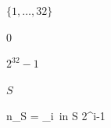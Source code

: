 \documentclass{article}
\begin{document}
$\{1,\ldots,32\}$
\pagebreak

$0$
\pagebreak

$2^{32}-1$
\pagebreak

$S$
\pagebreak

n_S = \sum_{i\ in S} 2^{i-1}
\pagebreak
\end{document}
